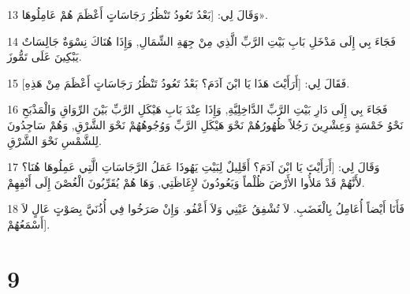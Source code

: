 \par 13 وَقَالَ لِي: [بَعْدُ تَعُودُ تَنْظُرُ رَجَاسَاتٍ أَعْظَمَ هُمْ عَامِلُوهَا».
\par 14 فَجَاءَ بِي إِلَى مَدْخَلِ بَابِ بَيْتِ الرَّبِّ الَّذِي مِنْ جِهَةِ الشِّمَالِ, وَإِذَا هُنَاكَ نِسْوَةٌ جَالِسَاتٌ يَبْكِينَ عَلَى تَمُّوزَ.
\par 15 فَقَالَ لِي: [أَرَأَيْتَ هَذَا يَا ابْنَ آدَمَ؟ بَعْدُ تَعُودُ تَنْظُرُ رَجَاسَاتٍ أَعْظَمَ مِنْ هَذِهِ].
\par 16 فَجَاءَ بِي إِلَى دَارِ بَيْتِ الرَّبِّ الدَّاخِلِيَّةِ, وَإِذَا عِنْدَ بَابِ هَيْكَلِ الرَّبِّ بَيْنَ الرِّوَاقِ وَالْمَذْبَحِ نَحْوُ خَمْسَةٍ وَعِشْرِينَ رَجُلاً ظُهُورُهُمْ نَحْوَ هَيْكَلِ الرَّبِّ وَوُجُوهُهُمْ نَحْوَ الشَّرْقِ, وَهُمْ سَاجِدُونَ لِلشَّمْسِ نَحْوَ الشَّرْقِ.
\par 17 وَقَالَ لِي: [أَرَأَيْتَ يَا ابْنَ آدَمَ؟ أَقَلِيلٌ لِبَيْتِ يَهُوذَا عَمَلُ الرَّجَاسَاتِ الَّتِي عَمِلُوهَا هُنَا؟ لأَنَّهُمْ قَدْ مَلأُوا الأَرْضَ ظُلْماً وَيَعُودُونَ لإِغَاظَتِي, وَهَا هُمْ يُقَرِّبُونَ الْغُصْنَ إِلَى أَنْفِهِمْ.
\par 18 فَأَنَا أَيْضاً أُعَامِلُ بِالْغَضَبِ. لاَ تُشْفِقُ عَيْنِي وَلاَ أَعْفُو. وَإِنْ صَرَخُوا فِي أُذُنَيَّ بِصَوْتٍ عَالٍ لاَ أَسْمَعُهُمْ].

\chapter{9}

